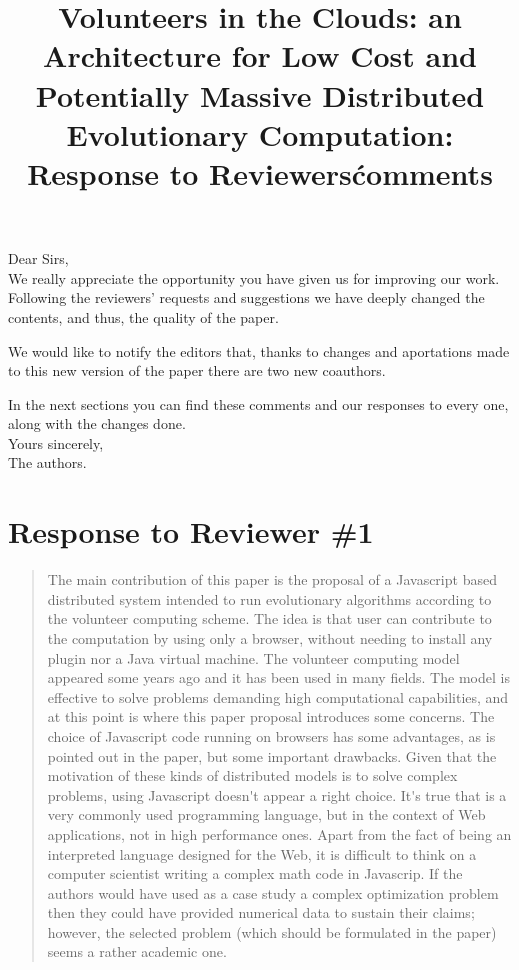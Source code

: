 \documentclass[preprint]{elsarticle}
\begin{document}

\title{Volunteers in the Clouds: an Architecture for Low Cost and
  Potentially Massive Distributed Evolutionary Computation: Response to Reviewers\' comments}

\noindent
Dear Sirs,\\

We really appreciate the opportunity you have given us for improving
our work. Following the reviewers' requests and suggestions we have
deeply changed the contents, and thus, the quality of the paper. 

We would like to notify the editors that, thanks to changes and
aportations made to this new version of the paper there are two new
coauthors. 

In the next sections you can find these comments and our responses
to every one, along with the changes done.\\ 

\noindent
Yours sincerely,\\
The authors.

\section{Response to Reviewer \#1}

\begin{quote}
The main contribution of this paper is the proposal of a Javascript based distributed system intended to
run evolutionary algorithms according to the volunteer computing scheme. The idea is that user can
contribute to the computation by using only a browser, without needing to install any plugin nor a Java
virtual machine.
The volunteer computing model appeared some years ago and it has been used in many fields. The
model is effective to solve problems demanding high computational capabilities, and at this point is where
this paper proposal introduces some concerns. The choice of Javascript code running on browsers has
some advantages, as is pointed out in the paper, but some important drawbacks. Given that the
motivation of these kinds of distributed models is to solve complex problems, using Javascript doesn\'{}t
appear a right choice. It\'{}s true that is a very commonly used programming language, but in the context of
Web applications, not in high performance ones. Apart from the fact of being an interpreted language
designed for the Web, it is difficult to think on a computer scientist writing a complex math code in
Javascrip. If the authors would have used as a case study a complex optimization problem then they
could have provided numerical data to sustain their claims; however, the selected problem (which should
be formulated in the paper) seems a rather academic one.
\end{quote}
\end{document}
